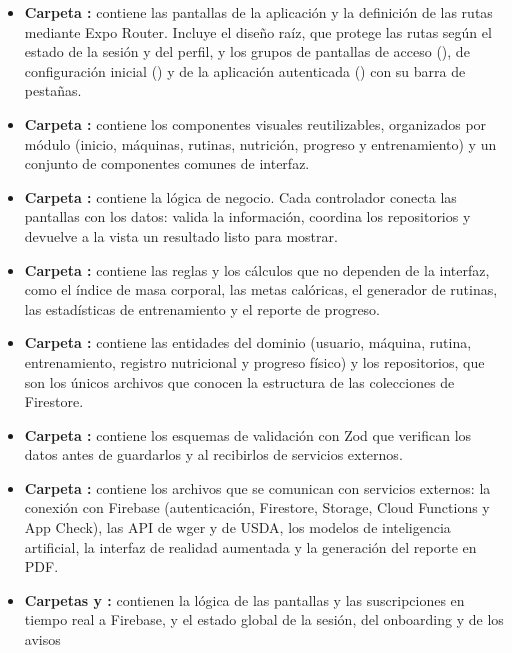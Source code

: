 \begin{itemize}
    \item \textbf{Carpeta :} contiene las pantallas de la
    aplicación y la definición de las rutas mediante Expo Router. Incluye el
    diseño raíz, que protege las rutas según el estado de la sesión y del
    perfil, y los grupos de pantallas de acceso (), de
    configuración inicial () y de la aplicación
    autenticada () con su barra de pestañas.
    \item \textbf{Carpeta :} contiene los
    componentes visuales reutilizables, organizados por módulo (inicio,
    máquinas, rutinas, nutrición, progreso y entrenamiento) y un conjunto de
    componentes comunes de interfaz.
    \item \textbf{Carpeta :} contiene la lógica de
    negocio. Cada controlador conecta las pantallas con los datos: valida la
    información, coordina los repositorios y devuelve a la vista un resultado
    listo para mostrar.
    \item \textbf{Carpeta :} contiene las reglas y los
    cálculos que no dependen de la interfaz, como el índice de masa corporal,
    las metas calóricas, el generador de rutinas, las estadísticas de
    entrenamiento y el reporte de progreso.
    \item \textbf{Carpeta :} contiene las entidades del
    dominio (usuario, máquina, rutina, entrenamiento, registro nutricional y
    progreso físico) y los repositorios, que son los únicos archivos que
    conocen la estructura de las colecciones de Firestore.
    \item \textbf{Carpeta :} contiene los esquemas de
    validación con Zod que verifican los datos antes de guardarlos y al
    recibirlos de servicios externos.
    \item \textbf{Carpeta :} contiene los archivos que
    se comunican con servicios externos: la conexión con Firebase
    (autenticación, Firestore, Storage, Cloud Functions y App Check), las
    API de wger y de USDA, los modelos de inteligencia artificial, la interfaz
    de realidad aumentada y la generación del reporte en PDF.
    \item \textbf{Carpetas  y :}
    contienen la lógica de las pantallas y las suscripciones en tiempo real a
    Firebase, y el estado global de la sesión, del onboarding y de los avisos

\end{itemize}
